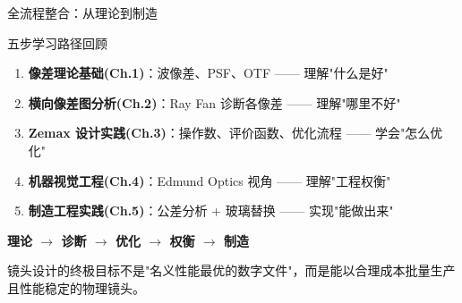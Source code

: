 \begin{frame}{全流程整合：从理论到制造}
    \begin{alertblock}{五步学习路径回顾}
        \begin{enumerate}
            \item \textbf{像差理论基础(Ch.1)}：波像差、PSF、OTF —— 理解"什么是好"
            \item \textbf{横向像差图分析(Ch.2)}：Ray Fan 诊断各像差 —— 理解"哪里不好"
            \item \textbf{Zemax 设计实践(Ch.3)}：操作数、评价函数、优化流程 —— 学会"怎么优化"
            \item \textbf{机器视觉工程(Ch.4)}：Edmund Optics 视角 —— 理解"工程权衡"
            \item \textbf{制造工程实践(Ch.5)}：公差分析 + 玻璃替换 —— 实现"能做出来"
        \end{enumerate}
    \end{alertblock}

    \bigbreak
    \begin{center}
        \textbf{理论 $\rightarrow$ 诊断 $\rightarrow$ 优化 $\rightarrow$ 权衡 $\rightarrow$ \alert{制造}}
    \end{center}

    \bigbreak
    镜头设计的终极目标不是"名义性能最优的数字文件"，而是\alert{能以合理成本批量生产且性能稳定的物理镜头}。
\end{frame}
